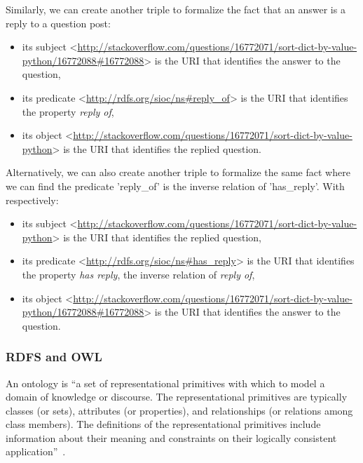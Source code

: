 Similarly, we can create another triple to formalize the fact that an answer is a reply to a question post:

\begin{itemize}
\item{its subject <\url{http://stackoverflow.com/questions/16772071/sort-dict-by-value-python/16772088#16772088}> is the URI that identifies the answer to the question,}
\item{its predicate <\url{http://rdfs.org/sioc/ns#reply_of}> is the URI that identifies the property \textit{reply of},}
\item{its object <\url{http://stackoverflow.com/questions/16772071/sort-dict-by-value-python}> is the URI that identifies the replied question.}
\end{itemize}
Alternatively, we can also create another triple to formalize the same fact where we can find the predicate 'reply\_of' is the inverse relation of 'has\_reply'. With respectively:
\begin{itemize}
\item{its subject <\url{http://stackoverflow.com/questions/16772071/sort-dict-by-value-python}> is the URI that identifies the replied question,}
\item{its predicate <\url{http://rdfs.org/sioc/ns#has_reply}> is the URI that identifies the property \textit{has reply}, the inverse relation of \textit{reply of},}
\item{its object <\url{http://stackoverflow.com/questions/16772071/sort-dict-by-value-python/16772088#16772088}> is the URI that identifies the answer to the question.}
\end{itemize}


\subsubsection{RDFS and OWL}
An ontology is ``a set of representational primitives with which to model a domain of knowledge or discourse. The representational primitives are typically classes (or sets), attributes (or properties), and relationships (or relations among class members). The definitions of the representational primitives include information about their meaning and constraints on their logically consistent application''~\cite{liu2009encyclopedia}.

